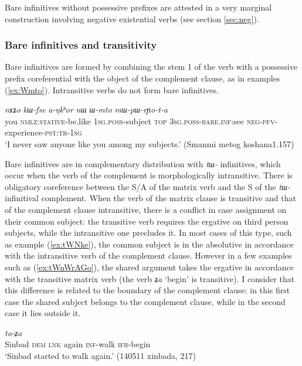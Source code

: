 \documentclass[oneside,a4paper,11pt]{article}
\newcommand{\ipa}[1]{\textit{\phon#1}}
\newcommand{\jpg}[2]{\ipa{#1} `#2'}
\newcommand{\refb}[1]{(\ref{#1})}
\begin{document}
Bare infinitives without possessive prefixes are attested in a very marginal construction involving negative existential verbs (see section \ref{sec:neg}).

\subsubsection{Bare infinitives and transitivity}
Bare infinitives are formed by combining the stem 1 of the verb with a possessive prefix coreferential with the object of the complement clause, as in examples (\ref{ex:Wmto}). Intransitive verbs do not form bare infinitives.

\begin{exe} 
\ex \label{ex:Wmto}
\gll \ipa{nɤʑo} 	\ipa{kɯ-fse} 	\ipa{a-ŋkʰor} 	\ipa{nɯ} 	\ipa{ɯ-mto} 	\ipa{mɯ-pɯ-rɲo-t-a} \\
you \textsc{nmlz:stative}-be.like \textsc{1sg.poss}-subject \textsc{top} \textsc{3sg.poss}-\textsc{bare.inf:}see \textsc{neg-pfv}-experience-\textsc{pst:tr-1sg} \\
\glt `I never saw anyone like you among my subjects.' (Smanmi metog koshana1.157)
\end{exe} 

Bare infinitives are in complementary distribution with \ipa{tɯ-} infinitives,  which occur when the verb of the complement is morphologically intransitive. There is obligatory coreference between the S/A of the matrix verb and the S of the \ipa{tɯ-} infinitival complement. When the verb of the matrix clause is transitive and that of the complement clause intransitive, there is a conflict in case assignment on their common subject: the transitive verb requires the ergative on third person subjects, while the intransitive one precludes it. In most cases of this type, such as example  \refb{ex:tWNke}, the common subject is in the absolutive in accordance with the intransitive verb of the complement clause. However in a few examples such as (\ref{ex:tWnWrAGo}), the shared argument takes the ergative in accordance with the transitive matrix verb (the verb \jpg{ʑa}{begin} is transitive).  I consider that this difference is related to the boundary of the complement clause: in this first case the shared subject belongs to the complement clause, while in the second case it lies outside it.

\begin{exe}
\ex \label{ex:tWNke}
\gll
[<xinbada> 	\ipa{nɯ} 	\ipa{tɕe} 	\ipa{li} 	\ipa{tɯ-ŋke}] 	\ipa{to-ʑa} \\
Sinbad \textsc{dem} \textsc{lnk} again  \textsc{inf}-walk \textsc{ifr}-begin \\
\glt `Sinbad started to walk again.' (140511 xinbada, 217)
\end{exe}
\end{document}
